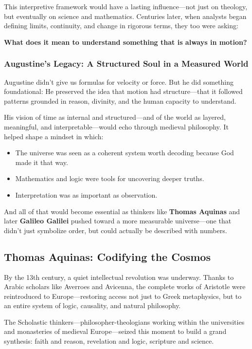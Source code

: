 This interpretive framework would have a lasting influence—not just on theology, but eventually on science and mathematics. Centuries later, when analysts began defining limits, continuity, and change in rigorous terms, they too were asking:  

\textbf{What does it mean to understand something that is always in motion?}

\subsubsection*{Augustine’s Legacy: A Structured Soul in a Measured World}

Augustine didn’t give us formulas for velocity or force. But he did something foundational:  
He preserved the idea that motion had structure—that it followed patterns grounded in reason, divinity, and the human capacity to understand.

His vision of time as internal and structured—and of the world as layered, meaningful, and interpretable—would echo through medieval philosophy. It helped shape a mindset in which:

\begin{itemize}
    \item The universe was seen as a coherent system worth decoding because God made it that way.
    \item Mathematics and logic were tools for uncovering deeper truths.
    \item Interpretation was as important as observation.
\end{itemize}

And all of that would become essential as thinkers like \textbf{Thomas Aquinas} and later \textbf{Galileo Galilei} pushed toward a more measurable universe—one that didn’t just symbolize order, but could actually be described with numbers.


\subsection{Thomas Aquinas: Codifying the Cosmos}

By the 13th century, a quiet intellectual revolution was underway. Thanks to Arabic scholars like Averroes and Avicenna, the complete works of Aristotle were reintroduced to Europe—restoring access not just to Greek metaphysics, but to an entire system of logic, causality, and natural philosophy. 

The Scholastic thinkers—philosopher-theologians working within the universities and monasteries of medieval Europe—seized this moment to build a grand synthesis: faith and reason, revelation and logic, scripture and science.

